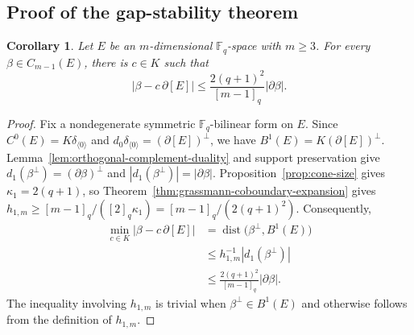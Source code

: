 \documentclass[11pt]{article}
\numberwithin{equation}{section}
\newtheorem{corollary}[theorem]{Corollary}
\newcommand{\F}{\mathbb F}
\begin{document}
\subsection{Proof of the gap-stability theorem}

\begin{corollary}
\label{cor:correcting-codimension-one-chain}
Let $E$ be an $m$-dimensional $\F_q$-space with $m\ge3$. For every
$\beta\in C_{m-1}(E)$, there is $c\in K$ such that
\[
 |\beta-c\,\partial[E]|
 \le
 \frac{2(q+1)^2}{[m-1]_q}|\partial\beta|.
\]
\end{corollary}

\begin{proof}
Fix a nondegenerate symmetric $\F_q$-bilinear form on $E$. Since
$C^0(E)=K\delta_{\langle0\rangle}$ and
$d_0\delta_{\langle0\rangle}=(\partial[E])^\perp$, we have
$B^1(E)=K(\partial[E])^\perp$.
Lemma~\ref{lem:orthogonal-complement-duality} and support preservation
give
$d_1(\beta^\perp)=(\partial\beta)^\perp$ and
$|d_1(\beta^\perp)|=|\partial\beta|$.
Proposition~\ref{prop:cone-size} gives $\kappa_1=2(q+1)$, so
Theorem~\ref{thm:grassmann-coboundary-expansion} gives
$h_{1,m}\ge [m-1]_q/([2]_q\kappa_1)
=[m-1]_q/(2(q+1)^2)$.
Consequently,
\begin{align*}
 \min_{c\in K}|\beta-c\,\partial[E]|
 &=
 \operatorname{dist}\bigl(\beta^\perp,B^1(E)\bigr)\\
 &\le
 h_{1,m}^{-1}|d_1(\beta^\perp)|\\
 &\le
 \frac{2(q+1)^2}{[m-1]_q}|\partial\beta|.
\end{align*}
The inequality involving $h_{1,m}$ is trivial when
$\beta^\perp\in B^1(E)$ and otherwise follows from the definition of
$h_{1,m}$.
\end{proof}
\end{document}
